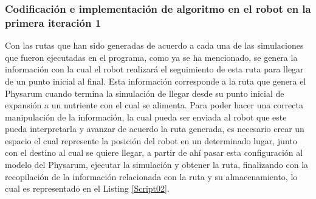 \subsubsection{Codificaci\'on e implementaci\'on de algoritmo en el robot en la primera iteraci\'on 1} %
\label{ssub:Codi}
    Con las rutas que han sido generadas de acuerdo a cada una
        de las simulaciones que fueron ejecutadas en el programa,
        como ya se ha mencionado, se genera la informaci\'on con la
        cual el robot realizar\'a el seguimiento de esta ruta para llegar
        de un punto inicial al final. Esta informaci\'on corresponde a
        la ruta que genera el Physarum cuando termina la simulaci\'on
        de llegar desde su punto inicial de expansi\'on a un nutriente
        con el cual se alimenta.
    \vskip 0.5cm
    Para poder hacer una correcta manipulaci\'on de la
        informaci\'on, la cual pueda ser enviada al robot que este
        pueda interpretarla y avanzar de acuerdo la ruta generada, es
        necesario crear un espacio el cual represente la posici\'on del
        robot en un determinado lugar, junto con el destino al cual se
        quiere llegar, a partir de ah\'i pasar esta configuraci\'on al
        modelo del Physarum, ejecutar la simulaci\'on y obtener la
        ruta, finalizando con la recopilaci\'on de la informaci\'on
        relacionada con la ruta y su almacenamiento, lo cual es
        representado en el Listing \ref{Script02}.
    \vskip 0.5cm
    
